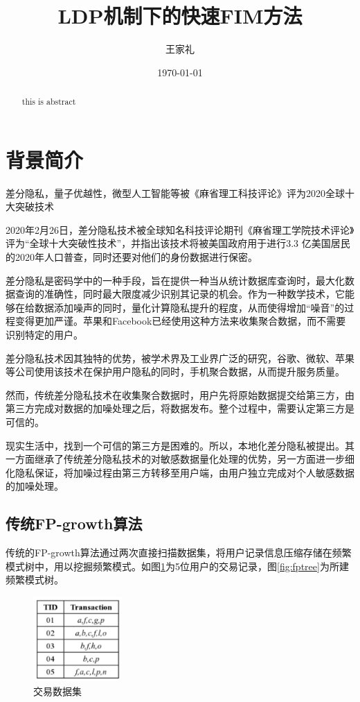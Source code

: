\documentclass[UTF8]{ctexart}
\title{LDP机制下的快速FIM方法}
\author{王家礼}
\date{\today}
\begin{document}
\maketitle %

\begin{abstract}%
this is abstract
\end{abstract}

\section{背景简介}
差分隐私，量子优越性，微型人工智能等被《麻省理工科技评论》评为2020全球十大突破技术

2020年2月26日，差分隐私技术被全球知名科技评论期刊《麻省理工学院技术评论》评为“全球十大突破性技术”，并指出该技术将被美国政府用于进行3.3 亿美国居民的2020年人口普查，同时还要对他们的身份数据进行保密。

差分隐私是密码学中的一种手段，旨在提供一种当从统计数据库查询时，最大化数据查询的准确性，同时最大限度减少识别其记录的机会。作为一种数学技术，它能够在给数据添加噪声的同时，量化计算隐私提升的程度，从而使得增加“噪音”的过程变得更加严谨。苹果和Facebook已经使用这种方法来收集聚合数据，而不需要识别特定的用户。

差分隐私技术因其独特的优势，被学术界及工业界广泛的研究，谷歌、微软、苹果等公司使用该技术在保护用户隐私的同时，手机聚合数据，从而提升服务质量。

然而，传统差分隐私技术在收集聚合数据时，用户先将原始数据提交给第三方，由第三方完成对数据的加噪处理之后，将数据发布。整个过程中，需要认定第三方是可信的。

现实生活中，找到一个可信的第三方是困难的。所以，本地化差分隐私被提出。其一方面继承了传统差分隐私技术的对敏感数据量化处理的优势，另一方面进一步细化隐私保证，将加噪过程由第三方转移至用户端，由用户独立完成对个人敏感数据的加噪处理。


\subsection{传统FP-growth算法}
传统的FP-growth算法通过两次直接扫描数据集，将用户记录信息压缩存储在频繁模式树中，用以挖掘频繁模式。如图\ref{fig:DB}为5位用户的交易记录，图\ref{fig:fptree}为所建频繁模式树。

  \begin{figure}[h]
    \centering
    \includegraphics[width=0.3\textwidth]{DB.pdf}
    \caption{交易数据集}
    \label{fig:DB}
  \end{figure}
\end{document}
